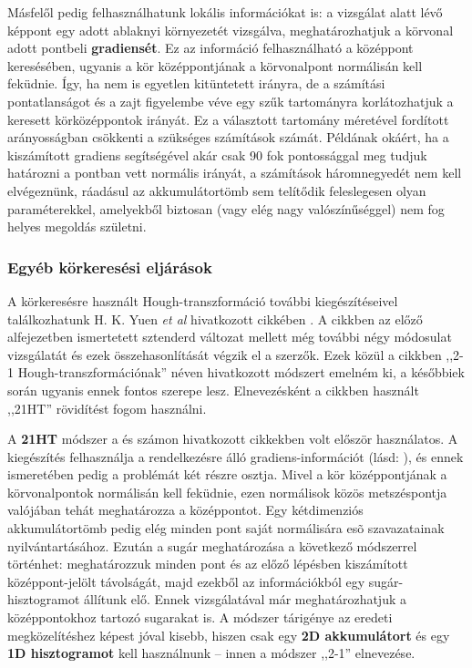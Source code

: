 Másfelől pedig felhasználhatunk lokális információkat is: a vizsgálat alatt lévő képpont egy adott ablaknyi környezetét vizsgálva, meghatározhatjuk a körvonal adott pontbeli \textbf{gradiensét}. Ez az információ felhasználható a középpont keresésében, ugyanis a kör középpontjának a körvonalpont normálisán kell feküdnie. Így, ha nem is egyetlen kitüntetett irányra, de a számítási pontatlanságot és a zajt figyelembe véve egy szűk tartományra korlátozhatjuk a keresett körközéppontok irányát. Ez a választott tartomány méretével fordított arányosságban csökkenti a szükséges számítások számát. Példának okáért, ha a kiszámított gradiens segítségével akár csak 90 fok pontossággal meg tudjuk határozni a pontban vett normális irányát, a számítások háromnegyedét nem kell elvégeznünk, ráadásul az akkumulátortömb sem telítődik feleslegesen olyan paraméterekkel, amelyekből biztosan (vagy elég nagy valószínűséggel) nem fog helyes megoldás születni.

\subsubsection{Egyéb körkeresési eljárások}\label{sect:korok_kiegeszites}

A körkeresésre használt Hough-transzformáció további kiegészítéseivel találkozhatunk H. K. Yuen \textit{et al} hivatkozott cikkében \cite{hough_circles}. A cikkben az előző alfejezetben ismertetett sztenderd változat mellett még további négy módosulat vizsgálatát és ezek összehasonlítását végzik el a szerzők. Ezek közül a cikkben ,,2-1 Hough-transzformációnak'' néven hivatkozott módszert emelném ki, a későbbiek során ugyanis ennek fontos szerepe lesz. Elnevezésként a cikkben használt ,,21HT'' rövidítést fogom használni.

A \textbf{21HT} módszer a \cite{hough_21_davies} és \cite{hough_21_illingworth} számon hivatkozott cikkekben volt először használatos. A kiegészítés felhasználja a rendelkezésre álló gradiens-információt (lásd: ), és ennek ismeretében pedig a problémát két részre osztja. Mivel a kör középpontjának a körvonalpontok normálisán kell feküdnie, ezen normálisok közös metszéspontja valójában tehát meghatározza a középpontot. Egy kétdimenziós akkumulátortömb pedig elég minden pont saját normálisára esõ szavazatainak nyilvántartásához. Ezután a sugár meghatározása a következő módszerrel történhet: meghatározzuk minden pont és az előző lépésben kiszámított középpont-jelölt távolságát, majd ezekből az információkból egy sugár-hisztogramot állítunk elő. Ennek vizsgálatával már meghatározhatjuk a középpontokhoz tartozó sugarakat is. A módszer tárigénye az eredeti megközelítéshez képest jóval kisebb, hiszen csak egy \textbf{2D akkumulátort} és egy \textbf{1D hisztogramot} kell használnunk -- innen a módszer ,,2-1'' elnevezése.

